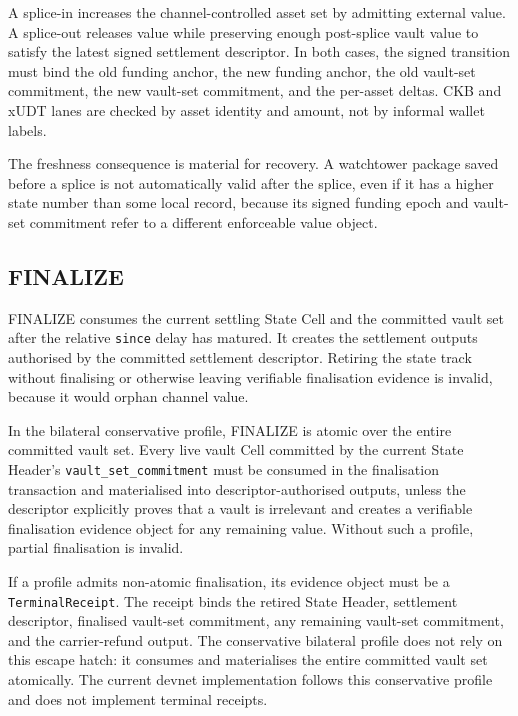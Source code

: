 \documentclass[a4paper,11pt]{article}
\begin{document}
A splice-in increases the channel-controlled asset set by admitting external value. A splice-out releases value while preserving enough post-splice vault value to satisfy the latest signed settlement descriptor. In both cases, the signed transition must bind the old funding anchor, the new funding anchor, the old vault-set commitment, the new vault-set commitment, and the per-asset deltas. CKB and xUDT lanes are checked by asset identity and amount, not by informal wallet labels.

The freshness consequence is material for recovery. A watchtower package saved before a splice is not automatically valid after the splice, even if it has a higher state number than some local record, because its signed funding epoch and vault-set commitment refer to a different enforceable value object.

\subsection{FINALIZE}

\textsf{FINALIZE} consumes the current settling State Cell and the committed vault set after the relative \texttt{since} delay has matured. It creates the settlement outputs authorised by the committed settlement descriptor. Retiring the state track without finalising or otherwise leaving verifiable finalisation evidence is invalid, because it would orphan channel value.

In the bilateral conservative profile, \textsf{FINALIZE} is atomic over the
entire committed vault set. Every live vault Cell committed by the current
State Header's \texttt{vault\_set\_commitment} must be consumed in the
finalisation transaction and materialised into descriptor-authorised outputs,
unless the descriptor explicitly proves that a vault is irrelevant and creates
a verifiable finalisation evidence object for any remaining value. Without
such a profile, partial finalisation is invalid.

If a profile admits non-atomic finalisation, its evidence object must be a
\texttt{TerminalReceipt}. The receipt binds the retired State Header, settlement
descriptor, finalised vault-set commitment, any remaining vault-set commitment,
and the carrier-refund output. The conservative bilateral profile does not rely
on this escape hatch: it consumes and materialises the entire committed vault
set atomically.
The current devnet implementation follows this conservative profile and does
not implement terminal receipts.
\end{document}
